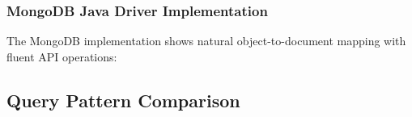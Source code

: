 \documentclass[12pt,a4paper]{article}
\begin{document}
\subsubsection{MongoDB Java Driver Implementation}
The MongoDB implementation shows natural object-to-document mapping with fluent API operations:
\begin{comment}
\begin{lstlisting}[language=Java, caption=MongoDB Java Driver Implementation]
public class MongoLibraryRepository implements LibraryRepository {
    private final MongoCollection<Document> students;
    
    @Override
    public List<Student> getAllStudents() {
        List<Student> results = new ArrayList<>();
        try (MongoCursor<Document> cursor = students.find()
                .sort(Sorts.ascending("name"))
                .iterator()) {
            while (cursor.hasNext()) {
                results.add(mapStudent(cursor.next()));
            }
        }
        return results;
    }
    
    @Override
    public void addStudent(Student student) {
        int id = student.getStudentId() != 0 ? student.getStudentId() : getNextSequence("student_id");
        Document doc = new Document("student_id", id)
            .append("name", student.getName())
            .append("email", student.getEmail())
            .append("phone", student.getPhone())
            .append("address", student.getAddress())
            .append("registration_date", formatDate(defaultDate(student.getRegistrationDate())));
        students.insertOne(doc);
        student.setStudentId(id);
    }
    
    private Student mapStudent(Document doc) {
        Student student = new Student();
        student.setStudentId(readInt(doc, "student_id"));
        student.setName(doc.getString("name"));
        student.setEmail(doc.getString("email"));
        student.setPhone(doc.getString("phone"));
        student.setAddress(doc.getString("address"));
        
        String dateStr = doc.getString("registration_date");
        if (dateStr != null) {
            student.setRegistrationDate(LocalDate.parse(dateStr, DATE_FORMAT));
        }
        return student;
    }
}
\end{lstlisting}
\end{comment}

\subsection{Query Pattern Comparison}
\end{document}
